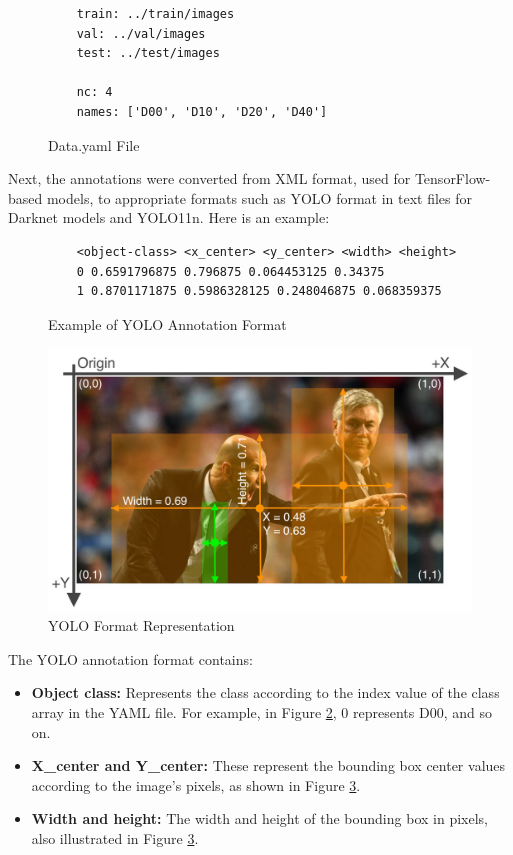 \begin{figure}[h]
    \centering
    \begin{verbatim}
    train: ../train/images
    val: ../val/images
    test: ../test/images
    
    nc: 4
    names: ['D00', 'D10', 'D20', 'D40']
    \end{verbatim}
    \caption{Data.yaml File}
    \label{fig:enter-label}
\end{figure}

Next, the annotations were converted from XML format, used for TensorFlow-based models, to appropriate formats such as YOLO format in text files for Darknet models and YOLO11n. Here is an example:

\begin{figure}[h]
    \centering
    \begin{verbatim}
    <object-class> <x_center> <y_center> <width> <height>
    0 0.6591796875 0.796875 0.064453125 0.34375
    1 0.8701171875 0.5986328125 0.248046875 0.068359375
    \end{verbatim}
    \caption{Example of YOLO Annotation Format}
    \label{fig:ann_yolo}
\end{figure}

\begin{figure}[H]
        \centering
        \includegraphics[width=0.5\linewidth]{figures/two-persons-tie.jpg}
        \caption{YOLO Format Representation}
        \label{fig:xyl}
\end{figure}

The YOLO annotation format contains:
\begin{itemize}
    \item \textbf{Object class:} Represents the class according to the index value of the class array in the YAML file. For example, in Figure \ref{fig:ann_yolo}, 0 represents D00, and so on.
    \item \textbf{X\_center and Y\_center:} These represent the bounding box center values according to the image's pixels, as shown in Figure \ref{fig:xyl}.
    
    \item \textbf{Width and height:} The width and height of the bounding box in pixels, also illustrated in Figure \ref{fig:xyl}.
\end{itemize}

